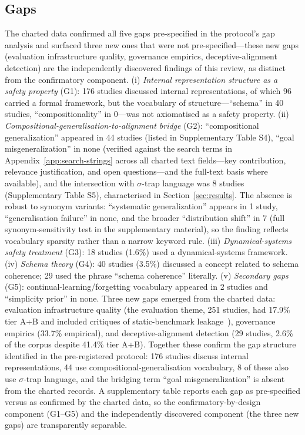 \subsection{Gaps}
The charted data confirmed all five gaps pre-specified in the protocol's gap analysis and surfaced three new ones that were not pre-specified---these new gaps (evaluation infrastructure quality, governance empirics, deceptive-alignment detection) are the independently discovered findings of this review, as distinct from the confirmatory component. (i) \emph{Internal representation structure as a safety property} (G1): 176 studies discussed internal representations, of which 96 carried a formal framework, but the vocabulary of structure---``schema'' in 40 studies, ``compositionality'' in 0---was not axiomatised as a safety property. (ii) \emph{Compositional-generalisation-to-alignment bridge} (G2): ``compositional generalization'' appeared in 44 studies (listed in Supplementary Table S4), ``goal misgeneralization'' in none (verified against the search terms in Appendix~\ref{app:search-strings} across all charted text fields---key contribution, relevance justification, and open questions---and the full-text basis where available), and the intersection with $\sigma$-trap language was 8 studies (Supplementary Table S5), characterised in Section~\ref{sec:results}. The absence is robust to synonym variants: ``systematic generalization'' appears in 1 study, ``generalisation failure'' in none, and the broader ``distribution shift'' in 7 (full synonym-sensitivity test in the supplementary material), so the finding reflects vocabulary sparsity rather than a narrow keyword rule. (iii) \emph{Dynamical-systems safety treatment} (G3): 18 studies (1.6\%) used a dynamical-systems framework. (iv) \emph{Schema theory} (G4): 40 studies (3.5\%) discussed a concept related to schema coherence; 29 used the phrase ``schema coherence'' literally. (v) \emph{Secondary gaps} (G5): continual-learning/forgetting vocabulary appeared in 2 studies and ``simplicity prior'' in none. Three new gaps emerged from the charted data: evaluation infrastructure quality (the evaluation theme, 251 studies, had 17.9\% tier A+B and included critiques of static-benchmark leakage~\cite{P864}), governance empirics (33.7\% empirical), and deceptive-alignment detection (29 studies, 2.6\% of the corpus despite 41.4\% tier A+B). Together these confirm the gap structure identified in the pre-registered protocol: 176 studies discuss internal representations, 44 use compositional-generalisation vocabulary, 8 of these also use $\sigma$-trap language, and the bridging term ``goal misgeneralization'' is absent from the charted records. A supplementary table reports each gap as pre-specified versus as confirmed by the charted data, so the confirmatory-by-design component (G1--G5) and the independently discovered component (the three new gaps) are transparently separable.


